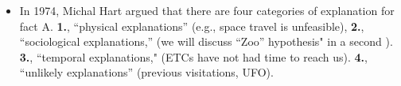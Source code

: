\begin{frame}
\begin{columns}
\begin{itemize}
\item In 1974, Michal Hart argued that there are four categories of explanation for fact A. {\bf 1.}, ``physical explanations'' (e.g., space travel is unfeasible), {\bf 2.}, ``sociological explanations,'' (we will discuss ``Zoo'' hypothesis" in a second ). {\bf 3.}, ``temporal explanations," (ETCs have not had time to reach us). {\bf 4.}, ``unlikely explanations'' (previous visitations, UFO). 
  
\end{itemize}
\end{columns}
\end{frame}


